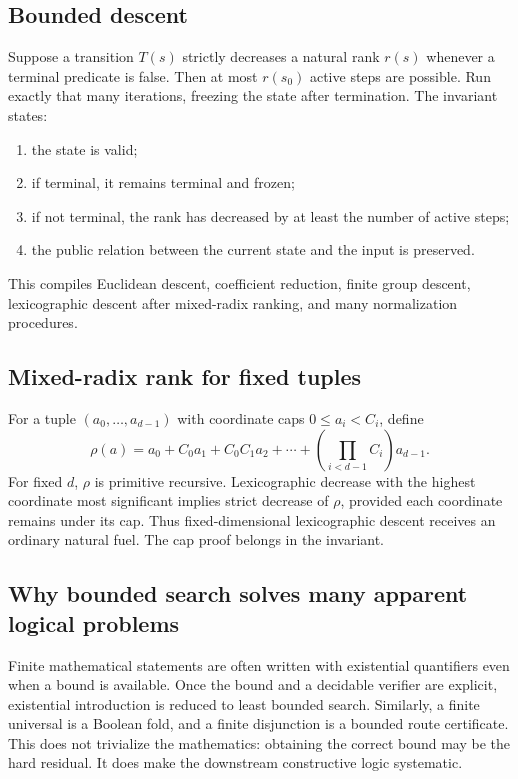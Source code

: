 \subsection{Bounded descent}

Suppose a transition \(T(s)\) strictly decreases a natural rank \(r(s)\) whenever a terminal predicate is false.  Then at most \(r(s_0)\) active steps are possible.  Run exactly that many iterations, freezing the state after termination.  The invariant states:
\begin{enumerate}
\item the state is valid;
\item if terminal, it remains terminal and frozen;
\item if not terminal, the rank has decreased by at least the number of active steps;
\item the public relation between the current state and the input is preserved.
\end{enumerate}
This compiles Euclidean descent, coefficient reduction, finite group descent, lexicographic descent after mixed-radix ranking, and many normalization procedures.

\subsection{Mixed-radix rank for fixed tuples}

For a tuple \((a_0,\ldots,a_{d-1})\) with coordinate caps \(0\le a_i<C_i\), define
\[
 \rho(a)=a_0+C_0a_1+C_0C_1a_2+\cdots+
 \left(\prod_{i<d-1}C_i\right)a_{d-1}.
\]
For fixed \(d\), \(\rho\) is primitive recursive.  Lexicographic decrease with the highest coordinate most significant implies strict decrease of \(\rho\), provided each coordinate remains under its cap.  Thus fixed-dimensional lexicographic descent receives an ordinary natural fuel.  The cap proof belongs in the invariant.

\subsection{Why bounded search solves many apparent logical problems}

Finite mathematical statements are often written with existential quantifiers even when a bound is available.  Once the bound and a decidable verifier are explicit, existential introduction is reduced to least bounded search.  Similarly, a finite universal is a Boolean fold, and a finite disjunction is a bounded route certificate.  This does not trivialize the mathematics: obtaining the correct bound may be the hard residual.  It does make the downstream constructive logic systematic.
